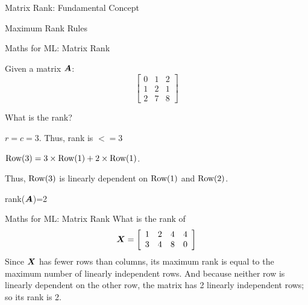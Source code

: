 \documentclass[handout]{beamer}
\begin{document}
\begin{frame}{Matrix Rank: Fundamental Concept}

\begin{examplebox}{Maximum Rank Rules}
\end{examplebox}

\end{frame}

\begin{frame}{Maths for ML: Matrix Rank}
\cleanitemize
{
    \item Given a matrix $\bm{A}$:$$
    \left[\begin{array}{lll}
    	{0} & {1} & {2} \\
    	{1} & {2} & {1} \\
    	{2} & {7} & {8}
    \end{array}\right]
    $$
    \item What is the rank?
    \item $r=c=3$. Thus, rank is $<=3$
    \item $\rm Row(3) = 3 \times \rm Row(1) + 2 \times \rm Row(1)$. 
    \item Thus, $\rm Row(3)$ is linearly dependent on $\rm Row(1)$ and $\rm Row(2)$.
    \item rank($\bm{A}$)=2
}
\end{frame}


\begin{frame}{Maths for ML: Matrix Rank}
What is the rank of
\begin{equation*}
\bm{X} =\left[\begin{array}{llll}
{1} & {2} & {4} & {4} \\
{3} & {4} & {8} & {0}
\end{array}\right]
\end{equation*}
\pause Since $\bm{X}$ has fewer rows than columns, its maximum rank is equal to the maximum number of linearly independent rows. And because neither row is linearly dependent on the other row, the matrix has 2 linearly independent rows; so its rank is 2.
\end{frame}
\end{document}
